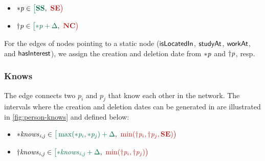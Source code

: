 \begin{itemize}
    \item $\varc{\ePerson} \in \interval{\xSS}{\xSE}$
    \item $\vard{\ePerson} \in \interval{\varc{\ePerson} + \Delta}{\xNC}$
\end{itemize}

For the edges of \tPerson nodes pointing to a static node
($\textsf{isLocatedIn}$,
$\textsf{studyAt}$,
$\textsf{workAt}$, and
$\textsf{hasInterest}$),
we assign the creation and deletion date from ${\ast}\mathit{\mathit{p}}$ and ${\dagger}\mathit{\mathit{p}}$, resp.


%


\subsubsection{Knows}

The \tKnows edge connects two \tPersons $p_i$ and $p_j$ that know each other in the network.
The intervals where the creation and deletion dates can be generated in are illustrated in \autoref{fig:person-knows} and defined below:
\begin{itemize}
    \item $\varc{\eKnows_{i,j}} \in \interval{\max(\varc{\ePerson}_{i},\varc{\ePerson}_{j}) + \Delta}{\min(\vard{\ePerson}_{i},\vard{\ePerson}_{j}, \xSE)}$
    \item $\vard{\eKnows_{i,j}} \in \interval{\varc{\eKnows_{i,j}} + \Delta}{\min (\vard{\ePerson}_{i}, \vard{\ePerson}_{j})}$
\end{itemize}


